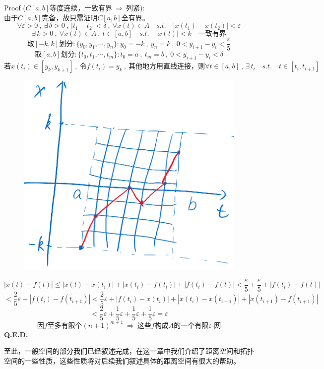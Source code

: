 Proof ($C[a,b]$等度连续，一致有界$ \ \Rightarrow \ $列紧):\\
由于$C[a,b]$完备，故只需证明$C[a,b]$全有界。
\[\forall \varepsilon>0 \ , \ \exists \, \delta>0 \ , \ |t_1-t_2|<\delta \ , \ \forall x(t) \in A \quad s.t. \quad |x(t_1)-x(t_2)|<\varepsilon\]
\[\exists \, k>0 \ , \ \forall x(t) \in A \ , \ t \in [a,b] \quad s.t. \quad |x(t)|<k \quad \text{一致有界}\]
\[\text{取$[-k,k]$划分}:\{y_0,y_1,\cdots,y_n\}:y_0=-k \ , \ y_n=k \ , \ 0<y_{i+1}-y_i<\frac{\varepsilon}{5}\]
\[\text{取$[a,b]$划分}:\{t_0,t_1,\cdots,t_m\}:t_0=a \ , \ t_m=b \ , \ 0<y_{i+1}-y_i<\delta\]
\[\text{若}x(t_i) \in [y_k,y_{k+1}] \ , \ \text{令}f(t_i)=y_k \ , \ \text{其他地方用直线连接，则}\forall t \in [a,b] \ , \ \exists \, t_i \quad s.t. \quad t \in [t_i,t_{i+1}]\]
\begin{figure}[htbp]
    \center
    \includegraphics[scale=0.3]{./fig/2.2.3-2.png}
\end{figure}
\[|x(t)-f(t)| \leq |x(t)-x(t_i)|+|x(t_i)-f(t_i)|+|f(t_i)-f(t)|<\frac{\varepsilon}{5}+\frac{\varepsilon}{5}+|f(t_i)-f(t)|\]
\[<\frac{2}{5}\varepsilon+|f(t_i)-f(t_{i+1})|<\frac{2}{5}\varepsilon+|f(t_i)-x(t_i)|+|x(t_i)-x(t_{i+1})|+|x(t_{i+1})-f(t_{i+1})|\]
\[<\frac{2}{5}\varepsilon+\frac{1}{5}\varepsilon+\frac{1}{5}\varepsilon+\frac{1}{5}\varepsilon=\varepsilon\]
\[\text{因$f$至多有限个}(n+1)^{m+1} \ \Rightarrow \ \text{这些$f$构成$A$的一个有限$\varepsilon$-网}\]
\textbf{Q.E.D.}

至此，一般空间的部分我们已经叙述完成，在这一章中我们介绍了距离空间和拓扑空间的一些性质，这些性质将对后续我们叙述具体的距离空间有很大的帮助。